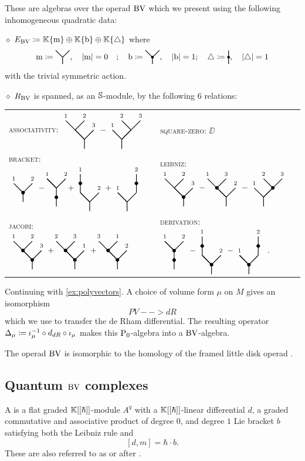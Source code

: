 \medskip\noindent 
These are algebras over the operad \(\mathrm{BV}\) which we present using the following inhomogeneous quadratic data:

\medskip\noindent \(\diamond\) \(E_{\mathrm{BV}} \coloneqq \mathbb{K}\{\mathrm{m}\} \oplus \mathbb{K}\{\mathrm{b}\}\oplus \mathbb{K}\{\triangle\}\) where
\[
\m \defeq \M, \quad |\m| = 0 \quad ; \quad \b \defeq \B, \quad |\b| = 1 ; \quad \triangle \defeq \D, \quad |\triangle| = 1
\]
with the trivial symmetric action.

\medskip\noindent \(\diamond\) \(R_{\mathrm{BV}}\) is spanned, as an \(\mathbb{S}\)-module, by the following 6 relations:

	\begin{tabular}{ll}
		\textnormal{\textsc{associativity:}} \(\LL{1}{2}{3} - \RR{1}{2}{3}\) &
		\textnormal{\textsc{square-zero:\quad}} \(\DD\) \\
		\textnormal{\textsc{bracket:}} \(\BB{1}{2} - \hspace*{-5pt} \DM{1}{2} \hspace*{-5pt} + \MDL{1}{2} + \MDR{1}{2}\) &
		\textnormal{\textsc{leibniz:}} \(\LBM{1}{2}{3}- \hspace*{-5pt} \LMB{1}{3}{2}-\RMB{1}{2}{3}\)\\
		\textnormal{\textsc{jacobi:}} \(\BBB{1}{2}{3}+ \hspace*{-5pt} \BBB{2}{3}{1}+ \hspace*{-5pt} \BBB{3}{1}{2}\) &
		\textnormal{\textsc{derivation:}} \(\DB{1}{2} - \BDL{1}{2} - \BDR{1}{2}\)~.
	\end{tabular}

\begin{example}
	Continuing with \cref{ex:polyvectors}. 
	A choice of volume form \(\mu\) on \(M\) gives an isomorphism
	\[
	PV --> dR
	\]
	which we use to transfer the de Rham differential.
	The resulting operator \(\Delta_\mu \coloneqq \iota^{-1}_\mu \circ d_{dR} \circ \iota_\mu\) makes this \(\mathrm{P}_0\)-algebra into a \(\mathrm{BV}\)-algebra.
\end{example}

The operad \(\mathrm{BV}\) is isomorphic to the homology of the framed little disk operad \cite{Getzler94}.

\subsection{Quantum \(\mathrm{BV}\) complexes}

A  is a flat graded \(\mathbb{K}[[\hbar]]\)-module \(A^q\) with a \(\mathbb{K}[[\hbar]]\)-linear differential \(d\), a graded commutative and associative product of degree \(0\), and degree \(1\) Lie bracket \(b\) satisfying both the Leibniz rule and
\[
[d, m] = \hbar \cdot b.
\]
These are also referred to as  or  after \cite{bibid}.

